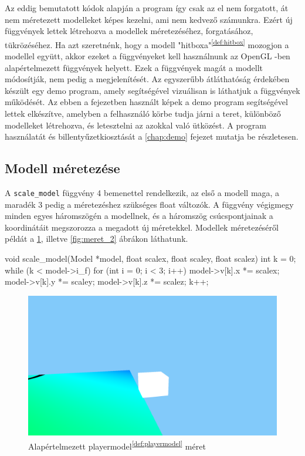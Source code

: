 Az eddig bemutatott kódok alapján a program így csak az el nem forgatott, át nem méretezett modelleket képes kezelni, ami nem kedvező számunkra. Ezért új függvények lettek létrehozva a modellek méretezéséhez, forgatásához, tükrözéséhez. Ha azt szeretnénk, hogy a modell "hitboxa"\textsuperscript{\ref{def:hitbox}} mozogjon a modellel együtt, akkor ezeket a függvényeket kell használnunk az OpenGL \cite{OpenGL}-ben alapértelmezett függvények helyett. Ezek a függvények magát a modellt módosítják, nem pedig a megjelenítését. Az egyszerűbb átláthatóság érdekében készült egy demo program, amely segítségével vizuálisan is láthatjuk a függvények működését. Az ebben a fejezetben használt képek a demo program segítségével lettek elkészítve, amelyben a felhasználó körbe tudja járni a teret, különböző modelleket létrehozva, és letesztelni az azokkal való ütközést. A program használatát és billentyűzetkiosztását a \ref{chap:demo} fejezet mutatja be részletesen.

\subsection{Modell méretezése}
A \texttt{scale\_model} függvény 4 bemenettel rendelkezik, az első a modell maga, a maradék 3 pedig a méretezéshez szükséges float változók. A függvény végigmegy minden egyes háromszögén a modellnek, és a háromszög csúcspontjainak a koordinátáit megszorozza a megadott új méretekkel. Modellek méretezéséről példát a \ref{fig:meret_1}, illetve \ref{fig:meret_2} ábrákon láthatunk.
\begin{cpp}
void scale_model(Model *model, float scalex, float scaley, 
float scalez)
{
    int k = 0;
    while (k < model->i_f)
    {
        for (int i = 0; i < 3; i++)
        {
            model->v[k].x *= scalex;
            model->v[k].y *= scaley;
            model->v[k].z *= scalez;
        }
        k++;
    }
}
\end{cpp}


\newpage

\begin{figure}[h]
	\centering
	\includegraphics[width=13truecm, height=7truecm]{images/modell_4.3.1.1.png}
	\caption{Alapértelmezett playermodel\textsuperscript{\ref{def:playermodel}} méret}
	\label{fig:meret_1}
\end{figure}

